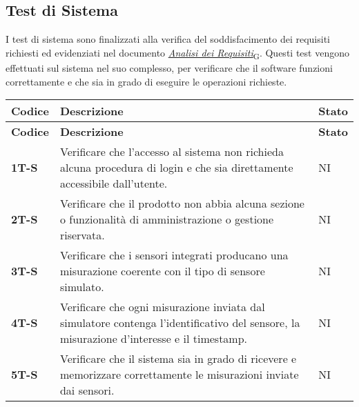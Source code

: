 \subsection{Test di Sistema}
I test di sistema sono finalizzati alla verifica del soddisfacimento dei requisiti richiesti ed evidenziati nel documento \href{https://7last.github.io/docs/rtb/documentazione-esterna/analisi-dei-requisiti}{\href{https://7last.github.io/docs/rtb/documentazione-interna/glossario\#analisi-dei-requisiti}{\textit{Analisi dei Requisiti}\textsubscript{G}}}. Questi test vengono effettuati sul sistema nel suo complesso, per verificare che il software funzioni correttamente e che sia in grado di eseguire le operazioni richieste. \\
\begin{longtable}{|>{\raggedright\arraybackslash}m{}|>{\raggedright\arraybackslash}m{}|>{\raggedright\arraybackslash}m{}|}
	\hline
	\textbf{Codice} & \textbf{Descrizione}                                                                                                                                                               & \textbf{Stato} \\
	\hline
	\endfirsthead
	\hline
	\textbf{Codice} & \textbf{Descrizione}                                                                                                                                                               & \textbf{Stato} \\
	\endhead
	\textbf{1T-S}   & Verificare che l'accesso al sistema non richieda alcuna procedura di login e che sia direttamente accessibile dall'utente.                                                         & NI             \\
	\hline
	\textbf{2T-S}   & Verificare che il prodotto non abbia alcuna sezione o funzionalità di amministrazione o gestione riservata.                                                                        & NI             \\
	\hline
	\textbf{3T-S}   & Verificare che i sensori integrati producano una misurazione coerente con il tipo di sensore simulato.                                                                             & NI             \\
	\hline
	\textbf{4T-S}   & Verificare che ogni misurazione inviata dal simulatore contenga l’identificativo del sensore, la misurazione d'interesse e il timestamp.                                           & NI             \\
	\hline
	\textbf{5T-S}   & Verificare che il sistema sia in grado di ricevere e memorizzare correttamente le misurazioni inviate dai sensori.                                                                 & NI             \\

\end{longtable}
